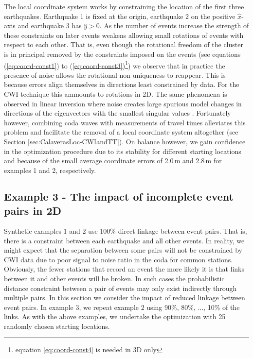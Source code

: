 \documentclass[extra, onecolumn, doublespacing]{gji}
\begin{document}
The local coordinate system works by constraining the location of
the first three earthquakes. Earthquake 1 is fixed at the origin,
earthquake 2 on the positive $\hat{x}$-axis and earthquake 3 has
$\hat{y}>0$. As the number of events increase the strength of these
constraints on later events weakens allowing small rotations of
events with respect to each other. That is, even though the
rotational freedom of the cluster is in principal removed by the
constraints imposed on the events (see equations
(\ref{eq:coord-const1}) to (\ref{eq:coord-const3})\footnote{equation
\ref{eq:coord-const4} is needed in 3D only}) we observe that in
practice the presence of noise allows the rotational non-uniqueness
to reappear. This is because errors align themselves in directions
least constrained by data. For the CWI technique this ammounts to rotations in 2D.
The same phenomena is observed in linear inversion where noise
creates large spurious model changes in directions of the
eigenvectors with the smallest singular values \citep{dr_Aster05a}.
 Fortunately however, combining coda waves with
measurements of travel times alleviates this problem and facilitate
the removal of a local coordinate system altogether (see Section
\ref{sec:CalaverasLoc-CWIandTT}). On balance however, we gain
confidence in the optimization procedure due to its stability for
different starting locations and because of the small average
coordinate errors of 2.0\,m and 2.8\,m for examples 1 and 2,
respectively.

\subsection{Example 3 - The impact of incomplete event pairs in 2D}

Synthetic examples 1 and 2 use 100\% direct linkage between event
pairs. That is, there is a constraint between each earthquake and
all other events. In reality, we might expect that the separation
between some pairs will not be constrained by CWI data due to poor
signal to noise ratio in the coda for common stations. Obviously,
the fewer stations that record an event the more likely it is that
links between it and other events will be broken. In such cases the
probabilistic distance constraint between a pair of events may only
exist indirectly through multiple pairs. In this section we consider
the impact of reduced linkage between event pairs. In example 3, we
repeat example 2 using 90\%, 80\%, ..., 10\% of the links. As with
the above examples, we undertake the optimization with 25 randomly
chosen starting locations.
\end{document}
